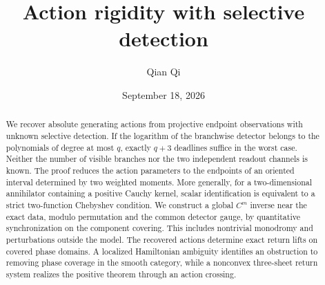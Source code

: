 \documentclass[11pt,reqno]{amsart}
\title[Action rigidity with selective detection]{Action rigidity with selective detection}
\author{Qian Qi}
\date{September 18, 2026}
\numberwithin{equation}{section}
\theoremstyle{definition}\newtheorem{definition}[theorem]{Definition}
\theoremstyle{remark}\newtheorem{remark}[theorem]{Remark}
\begin{document}
\begin{abstract}
We recover absolute generating actions from projective endpoint observations
with unknown selective detection. If the logarithm of the branchwise detector
belongs to the polynomials of degree at most $q$, exactly $q+3$ deadlines
suffice in the worst case. Neither the number of visible branches nor the
two independent readout channels is known. The proof reduces the action
parameters to the endpoints of an oriented interval determined by two
weighted moments. More generally, for a two-dimensional annihilator
containing a positive Cauchy kernel, scalar identification is equivalent
to a strict two-function Chebyshev condition. We construct a global
$C^m$ inverse near the exact data, modulo permutation and the common
detector gauge, by quantitative synchronization on the component covering.
This includes nontrivial monodromy and perturbations outside the model.
The recovered actions determine exact return lifts on covered phase domains.
A localized Hamiltonian ambiguity identifies an obstruction to removing
phase coverage in the smooth category, while a nonconvex three-sheet
return system realizes the positive theorem through an action crossing.
\end{abstract}
\maketitle
\setcounter{tocdepth}{1}
\tableofcontents
\end{document}

